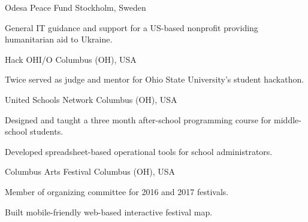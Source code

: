 

\begin{cventries}

  \cventryshort
    {Odesa Peace Fund} %
    {Stockholm, Sweden} %
    {
      \begin{cvitems} %
        \item {General IT guidance and support for a US-based nonprofit providing humanitarian aid to Ukraine.}
      \end{cvitems}
    }

  \cventryshort
    {Hack OHI/O} %
    {Columbus (OH), USA} %
    {
      \begin{cvitems} %
        \item {Twice served as judge and mentor for Ohio State University's student hackathon.}
      \end{cvitems}
    }

  \cventryshort
    {United Schools Network} %
    {Columbus (OH), USA} %
    {
      \begin{cvitems} %
        \item {Designed and taught a three month after-school programming course for middle-school students.}
        \item {Developed spreadsheet-based operational tools for school administrators.}
      \end{cvitems}
    }

  \cventryshort
    {Columbus Arts Festival} %
    {Columbus (OH), USA} %
    {
      \begin{cvitems} %
        \item {Member of organizing committee for 2016 and 2017 festivals.}
        \item {Built mobile-friendly web-based interactive festival map.}
      \end{cvitems}
    }

\end{cventries}
